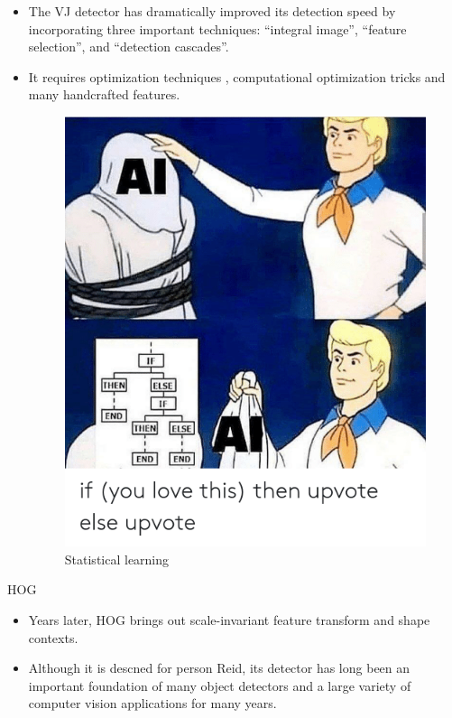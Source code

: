 \documentclass{beamer}
\begin{document}
\begin{frame}
    \begin{itemize}[<+-| alert@+>]
        \item The VJ detector has dramatically improved its detection speed by incorporating three important techniques: ``integral image'', ``feature selection'', and ``detection cascades''. 
        \item It requires optimization techniques , computational optimization tricks and many handcrafted features.
        \begin{figure}[h!]
            \begin{center}
                \includegraphics[width=0.4\linewidth]{memehandcraft.png}
                \caption{\small Statistical learning}
            \end{center}
        \end{figure}
    \end{itemize}

\end{frame}

\begin{frame}{HOG}
    \begin{itemize}
        \item Years later, HOG brings out scale-invariant feature transform and shape contexts. 
        \item Although it is descned for person Reid, its detector has long been an important foundation of many object detectors 
        \tiem and a large variety of computer vision applications for many years.
    \end{itemize}
\end{frame}
\end{document}
